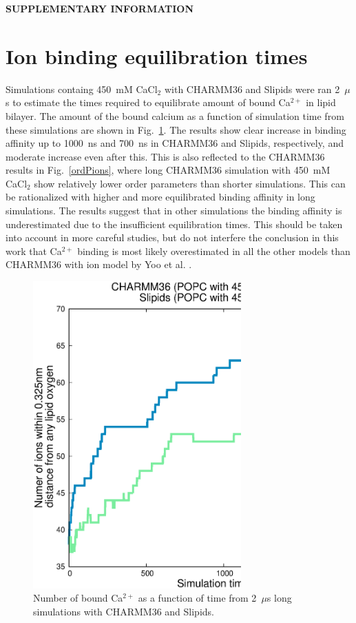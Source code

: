 \documentclass[twoside,twocolumn,9pt]{article}
\begin{document}
\newpage

\appendix
\begin{center}
{\bf SUPPLEMENTARY INFORMATION}
\end{center}
\section{Ion binding equilibration times}
Simulations containg 450~mM CaCl$_2$ with CHARMM36 and Slipids were ran 2~$\mu$s to estimate the times
required to equilibrate amount of bound Ca$^{2+}$ in lipid bilayer. The amount of the bound calcium
as a function of simulation time from these simulations are shown in Fig.~\ref{longruns}.
The results show clear increase in binding affinity up to 1000~ns and 700~ns in CHARMM36 and Slipids, respectively,
and moderate increase even after this. This is also reflected to the CHARMM36 results in Fig.~\ref{ordPions}, where
long CHARMM36 simulation with 450~mM CaCl$_2$ show relatively lower order parameters than shorter simulations. 
This can be rationalized with higher and more equilibrated binding affinity in long simulations. 
The results suggest that in other simulations the binding affinity 
is underestimated due to the insufficient equilibration times. This should be taken into account in more careful studies,
but do not interfere the conclusion in this work that Ca$^{2+}$ binding is most likely overestimated in all the
other models than CHARMM36 with ion model by Yoo et al. \cite{yoo16}.
\begin{figure}[]
  \centering
  \includegraphics[width=8cm]{../Fig/bindingINlongRUNS.eps} 
  \caption{\label{longruns}
    Number of bound Ca$^{2+}$ as a function of time from 2~$\mu$s long simulations with CHARMM36 and Slipids.
}
\end{figure}
\end{document}
